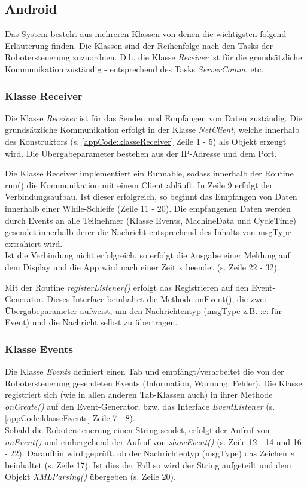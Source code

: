 \subsection{Android}
\label{sec:ChapterAndroid}
Das System besteht aus mehreren Klassen von denen die wichtigsten folgend 
Erläuterung finden. Die Klassen sind der Reihenfolge nach den Tasks der 
Robotersteuerung zuzuordnen. D.h. die Klasse \textit{Receiver} ist für die 
grundsätzliche Kommunikation zuständig - entsprechend des Tasks 
\textit{ServerComm}, etc.

\subsubsection{Klasse Receiver}
Die Klasse \textit{Receiver} ist für das Senden und Empfangen von Daten 
zuständig. Die grundsätzliche Kommunikation erfolgt in der Klasse 
\textit{NetClient}, 
welche innerhalb des Konstruktors (s. \ref{appCode:klasseReceiver} Zeile 1 - 5) 
als Objekt erzeugt wird. Die Übergabeparameter bestehen aus der IP-Adresse und 
dem Port.

Die Klasse Receiver implementiert ein Runnable, sodass innerhalb der Routine 
run() die Kommunikation mit einem Client abläuft. In Zeile 9 erfolgt der 
Verbindungsaufbau. Ist dieser erfolgreich, so beginnt das Empfangen von Daten 
innerhalb einer While-Schleife (Zeile 11 - 20). Die empfangenen Daten werden 
durch Events an alle Teilnehmer (Klasse Events, MachineData und CycleTime) 
gesendet innerhalb derer die Nachricht entsprechend des Inhalts von 
msgType extrahiert wird.\\
Ist die Verbindung nicht erfolgreich, so erfolgt die Ausgabe einer Meldung auf 
dem Display und die App wird nach einer Zeit x beendet (s. Zeile 22 - 32).

Mit der Routine \textit{registerListener()} erfolgt das Registrieren auf den 
Event-Generator. Dieses Interface beinhaltet die Methode onEvent(), die zwei 
Übergabeparameter aufweist, um den Nachrichtentyp (msgType z.B. :e: für Event) 
und die Nachricht selbst zu übertragen.



\subsubsection{Klasse Events}
Die Klasse \textit{Events} definiert einen Tab und empfängt/verarbeitet die von 
der Robotersteuerung gesendeten Events (Information, Warnung, Fehler). Die 
Klasse registriert sich (wie in allen anderen Tab-Klassen auch) in ihrer 
Methode \textit{onCreate()} auf den Event-Generator, bzw. das Interface 
\textit{EventListener} (s. \ref{appCode:klasseEvents} Zeile 7 - 8).\\
Sobald die Robotersteuerung einen String sendet, erfolgt der Aufruf von 
\textit{onEvent()} und einhergehend der Aufruf von \textit{showEvent()} (s. 
Zeile 12 - 14 und 16 - 22). Daraufhin wird geprüft, ob der Nachrichtentyp 
(msgType) das 
Zeichen \textit{e} beinhaltet (s. Zeile 17). Ist dies der Fall so wird der 
String aufgeteilt und dem Objekt \textit{XMLParsing()} übergeben (s. Zeile 20).

